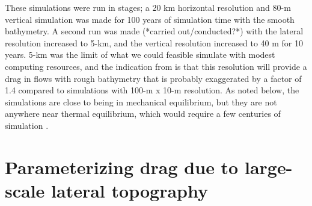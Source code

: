 \documentclass[twocol]{ametsocV5}
\newcommand{\tempS}[1]{}
\newcommand{\twowidth}[0]{4in}
\begin{document}
These simulations were run in stages; a 20 km horizontal resolution and 80-m vertical simulation was made for 100 years of simulation time with the smooth bathymetry.  A second run was made (*carried out/conducted?*) with the lateral resolution increased to 5-km, and the vertical resolution increased to 40 m for 10 years. 5-km was the limit of what we could feasible simulate with modest computing resources, and the indication from \citet{klymak18} is that this resolution will provide a drag in flows with rough bathymetry that is probably exaggerated by a factor of 1.4 compared to simulations with  100-m x 10-m resolution.     
As noted below, the simulations are close to being in mechanical equilibrium, but they are not anywhere near thermal equilibrium, which would require a few centuries of simulation \citep[i.e.][run similar simulations for 620 years]{Munday_2015}.   

\section{Parameterizing drag due to large-scale lateral topography}
\label{sec:ResultsSingleFlow}


\end{document}
